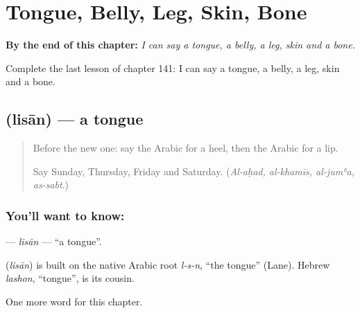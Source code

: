 
\chapter{Tongue, Belly, Leg, Skin, Bone}
\label{ch:ar-tongue-belly-leg-skin-bone}

\begin{chapteropening}
\textbf{By the end of this chapter:} \emph{I can say a tongue, a belly, a leg, skin and a bone.}

Complete the last lesson of chapter 141: I can say a tongue, a belly, a leg, skin and a bone.
\end{chapteropening}

\section[\texorpdfstring{\ar{لسان} (lisān)}{لسان (lisān)}]{ (lisān) — a tongue}

\label{lesson:AR-C141-lisan}



\begin{quote}
Before the new one: say the Arabic for a heel, then the Arabic for a lip.

Say Sunday, Thursday, Friday and Saturday. (\emph{Al-aḥad, al-khamīs, al-jumʿa, as-sabt}.)
\end{quote}

\subsection*{You'll want to know: }
\textbf{} — \emph{lisān} — \textquotedblleft{}a tongue\textquotedblright{}.

\begin{cousinweb}
\textbf{} (\emph{lisān}) is built on the native Arabic root \emph{l-s-n}, \textquotedblleft{}the tongue\textquotedblright{} (Lane). Hebrew \emph{lashon}, \textquotedblleft{}tongue\textquotedblright{}, is its cousin.
\end{cousinweb}

\begin{grammarlens}[title={What you've built}]
One more word for this chapter.
\end{grammarlens}

